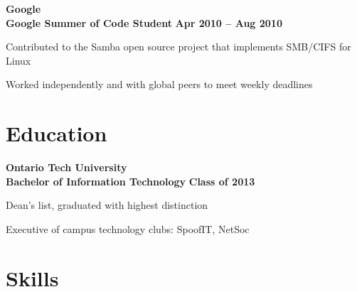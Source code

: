 \documentclass[margin,line]{resume}
\begin{document}
\begin{resume}
    \hspace{-3mm}\textbf{\listing Google}\vspace{2mm}\\\vspace{1mm}
    \hspace{1.2mm}\textbf{Google Summer of Code Student} \hfill \textbf{Apr 2010 -- Aug 2010}\vspace{1mm}
    \begin{list2}
        \item Contributed to the Samba open source project that implements SMB/CIFS for Linux
        \item Worked independently and with global peers to meet weekly deadlines
    \end{list2}


\sectionline

    \section{\mysidestyle \textbf{\large{E}\small{ducation}}}

    \hspace{-3mm}\textbf{\listing Ontario Tech University} \vspace{2mm}\\\vspace{1mm}%
    \hspace{2.4mm}\textbf{Bachelor of Information Technology} \hfill \textbf{Class of 2013}\vspace{1mm}%
    \begin{list2}
        \item Dean’s list, graduated with highest distinction
        \item Executive of campus technology clubs: SpoofIT, NetSoc
    \end{list2}\vspace{-1.5mm}


\sectionline
    \section{\mysidestyle \textbf{\large{S}\small{kills}}}


\end{resume}
\end{document}
